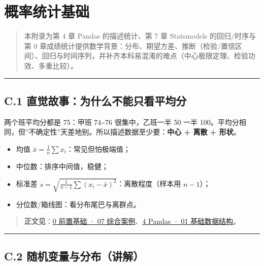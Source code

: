 \chapter{概率统计基础}\label{ux6982ux7387ux7edfux8ba1ux57faux7840}

\begin{quote}
本附录为第 4 章 Pandas 的描述统计、第 7 章 Statsmodels 的回归/时序与第 0
章成绩统计提供数学背景：分布、期望方差、推断（检验/置信区间）、回归与时间序列，并补齐本科易混淆的难点（中心极限定理、检验功效、多重比较）。
\end{quote}

\begin{center}\rule{0.5\linewidth}{0.5pt}\end{center}

\section{C.1
直觉故事：为什么不能只看平均分}\label{c.1-ux76f4ux89c9ux6545ux4e8bux4e3aux4ec0ux4e48ux4e0dux80fdux53eaux770bux5e73ux5747ux5206}

两个班平均分都是 75：甲班 74\textasciitilde76 很集中，乙班一半 50 一半
100。平均分相同，但''不确定性''天差地别。所以描述数据至少要：\textbf{中心
+ 离散 + 形状}。

\begin{itemize}
\tightlist
\item
  均值 \(\bar{x}=\frac{1}{n}\sum x_i\)：常见但怕极端值；
\item
  中位数：排序中间值，稳健；
\item
  标准差 \(s=\sqrt{\frac{1}{n-1}\sum(x_i-\bar{x})^2}\)：离散程度（样本用
  \(n-1\)）；
\item
  分位数/箱线图：看分布尾巴与离群点。
\end{itemize}

\begin{quote}
\textbf{正文见}：\href{../../chapters/00-prep/00-07-综合案例.md}{0
前置基础 · 07
综合案例}、\href{../../chapters/04-pandas/01-基础数据结构.md}{4 Pandas ·
01 基础数据结构}。
\end{quote}

\begin{center}\rule{0.5\linewidth}{0.5pt}\end{center}

\section{C.2
随机变量与分布（讲解）}\label{c.2-ux968fux673aux53d8ux91cfux4e0eux5206ux5e03ux8bb2ux89e3}

